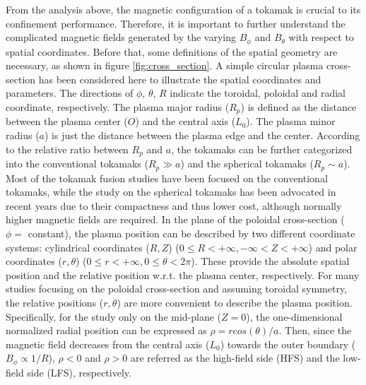 From the analysis above, the magnetic configuration of a tokamak is crucial to its confinement performance. Therefore, it is important to further understand the complicated magnetic fields generated by the varying $B_{\phi}$ and $B_{\theta}$ with respect to spatial coordinates. Before that, some definitions of the spatial geometry are necessary, as shown in figure \ref{fig:cross_section}. A simple circular plasma cross-section has been considered here to illustrate the spatial coordinates and parameters. The directions of $\phi$, $\theta$, $R$ indicate the toroidal, poloidal and radial coordinate, respectively. The plasma major radius ($R_p$) is defined as the distance between the plasma center ($O$) and the central axis ($L_0$). The plasma minor radius ($a$) is just the distance between the plasma edge and the center. According to the relative ratio between $R_p$ and $a$, the tokamaks can be further categorized into the conventional tokamaks ($R_p \gg a$) and the spherical tokamaks ($R_p \sim a$). Most of the tokamak fusion studies have been focused on the conventional tokamaks, while the study on the spherical tokamaks has been advocated in recent years due to their compactness and thus lower cost, although normally higher magnetic fields are required. In the plane of the poloidal cross-section ($\phi = $ constant), the plasma position can be described by two different coordinate systems: cylindrical coordinates ($R, Z$) ($0 \leq R < +\infty, -\infty < Z < +\infty$) and polar coordinates ($r, \theta$) ($0 \leq r < +\infty, 0 \leq \theta < 2\pi$). These provide the absolute spatial position and the relative position w.r.t. the plasma center, respectively. For many studies focusing on the poloidal cross-section and assuming toroidal symmetry, the relative positions ($r, \theta$) are more convenient to describe the plasma position. Specifically, for the study only on the mid-plane ($Z = 0$), the one-dimensional normalized radial position can be expressed as $\rho = rcos(\theta)/a$. Then, since the magnetic field decreases from the central axis ($L_0$) towards the outer boundary ($B_{\phi} \propto 1/R$), $\rho < 0$ and $\rho > 0$ are referred as the high-field side (HFS) and the low-field side (LFS), respectively.


